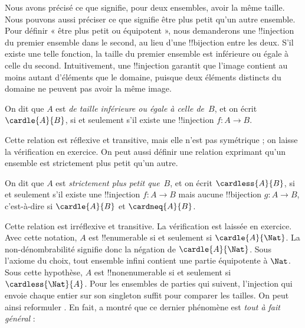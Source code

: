 \documentclass[../../../include/open-logic-section]{subfiles}
\begin{document}


\begin{explain}
Nous avons précisé ce que signifie, pour deux ensembles, avoir la
même taille. Nous pouvons aussi préciser ce que signifie être plus
petit qu'un autre ensemble. Pour définir « être plus petit ou
équipotent », nous demanderons une !!{injection} du premier ensemble
dans le second, au lieu d'une !!{bijection} entre les deux. S'il existe
une telle fonction, la taille du premier ensemble est inférieure ou
égale à celle du second. Intuitivement, une !!{injection} garantit
que l'image contient au moins autant d'éléments que le domaine,
puisque deux éléments distincts du domaine ne peuvent pas avoir
la même image.
\end{explain}

\begin{defn}
On dit que $A$ est \emph{de taille inférieure ou égale à celle
de}~$B$, et on écrit $\cardle{A}{B}$, si et seulement s'il existe
une !!{injection} $f \colon A \to B$.
\end{defn}

Cette relation est réflexive et transitive, mais elle n'est pas
symétrique ; on laisse la vérification en exercice. On peut aussi
définir une relation exprimant qu'un ensemble est strictement plus
petit qu'un autre.

\begin{defn}
On dit que $A$ est \emph{strictement plus petit que}~$B$, et on écrit
$\cardless{A}{B}$, si et seulement s'il existe une !!{injection}
$f\colon A \to B$ mais aucune !!{bijection} $g\colon A \to B$,
c'est-à-dire si $\cardle{A}{B}$ et $\cardneq{A}{B}$.
\end{defn}

Cette relation est irréflexive et transitive. La vérification est
laissée en exercice. Avec cette notation, $A$ est !!{enumerable}
si et seulement si $\cardle{A}{\Nat}$. La non-dénombrabilité signifie
donc la négation de $\cardle{A}{\Nat}$. Sous l'axiome
du choix, tout ensemble infini contient une partie équipotente à
$\Nat$. Sous cette hypothèse, $A$ est !!{nonenumerable} si et
seulement si $\cardless{\Nat}{A}$. Pour les ensembles de parties
qui suivent, l’injection qui envoie chaque entier sur son singleton
suffit pour comparer les tailles.
%
%
On peut ainsi reformuler
.
En fait, \citet{Cantor1892} a montré que ce dernier phénomène est
\emph{tout à fait général} :
\end{document}
